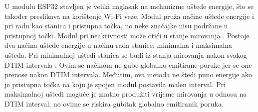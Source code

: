 U modulu ESP32 stavljen je veliki naglasak na mehanizme uštede energije, što se također preslikava na korištenje Wi-Fi veze. Modul pruža načine uštede energije i pri radu kao stanica i pristupna točka, no neke značajke nisu podržane u pristupnoj točki. Modul pri neaktivnosti može otići u stanje mirovanja . Postoje dva načina uštede energije u načinu rada stanice: minimalna i maksimalna ušteda. Pri minimalnoj uštedi stanica se budi iz stanja mirovanja nakon svakog DTIM intervala . Ovim se načinom ne gube globalno emitirane poruke  jer se one prenose nakon DTIM intervala. Međutim, ova metoda ne štedi puno energije ako je pristupna točka na koju je spojen modul postavila malen interval. Pri maksimalnoj uštedi moguće je znatno produžiti vrijeme mirovanja u odnosu na DTIM interval, no ovime se riskira gubitak globalno emitiranih poruka. 

\eject